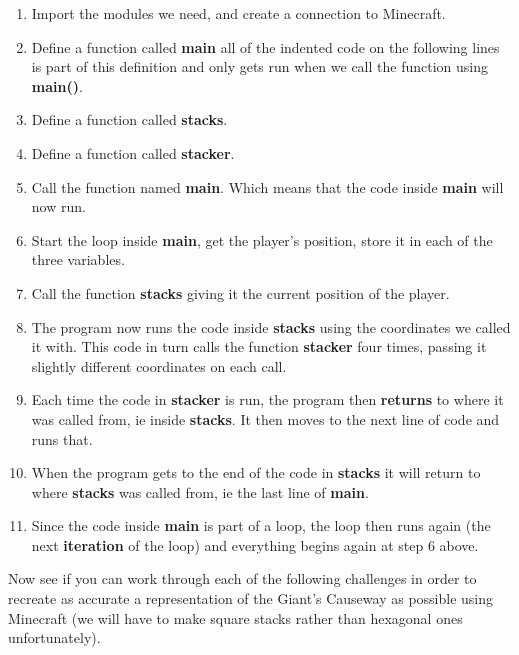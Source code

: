\documentclass{geocraft-worksheet-multipage}
\begin{document}
\begin{enumerate}

\item Import the modules we need, and create a connection to
  Minecraft.

\item Define a function called \textbf{main} all of the indented code
  on the following lines is part of this definition and only gets run
  when we call the function using \textbf{main()}.

\item Define a function called \textbf{stacks}.

\item Define a function called \textbf{stacker}.

\item Call the function named \textbf{main}. Which means that the code
  inside \textbf{main} will now run.

\item Start the loop inside \textbf{main}, get the player's position,
  store it in each of the three variables.

\item Call the function \textbf{stacks} giving it the current position
  of the player.

\item The program now runs the code inside \textbf{stacks} using the
  coordinates we called it with. This code in turn calls the function
  \textbf{stacker} four times, passing it slightly different
  coordinates on each call.

\item Each time the code in \textbf{stacker} is run, the program then
  \textbf{returns} to where it was called from, ie inside
  \textbf{stacks}. It then moves to the next line of code and runs
  that. 

\item When the program gets to the end of the code in \textbf{stacks}
  it will return to where \textbf{stacks} was called from, ie the last
  line of \textbf{main}.

\item Since the code inside \textbf{main} is part of a loop, the loop
  then runs again (the next \textbf{iteration} of the loop) and
  everything begins again at step 6 above.

\end{enumerate}

Now see if you can work through each of the following challenges in
order to recreate as accurate a representation of the Giant's Causeway
as possible using Minecraft (we will have to make square stacks rather
than hexagonal ones unfortunately).
\end{document}
